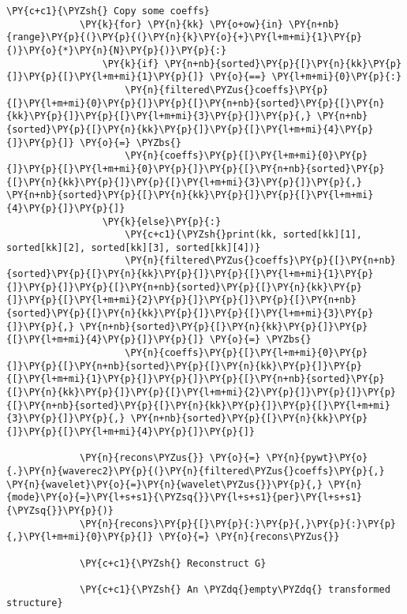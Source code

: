 \begin{Verbatim}[commandchars=\\\{\}]
             \PY{c+c1}{\PYZsh{} Copy some coeffs}
             \PY{k}{for} \PY{n}{kk} \PY{o+ow}{in} \PY{n+nb}{range}\PY{p}{(}\PY{p}{(}\PY{n}{k}\PY{o}{+}\PY{l+m+mi}{1}\PY{p}{)}\PY{o}{*}\PY{n}{N}\PY{p}{)}\PY{p}{:}
                 \PY{k}{if} \PY{n+nb}{sorted}\PY{p}{[}\PY{n}{kk}\PY{p}{]}\PY{p}{[}\PY{l+m+mi}{1}\PY{p}{]} \PY{o}{==} \PY{l+m+mi}{0}\PY{p}{:}
                     \PY{n}{filtered\PYZus{}coeffs}\PY{p}{[}\PY{l+m+mi}{0}\PY{p}{]}\PY{p}{[}\PY{n+nb}{sorted}\PY{p}{[}\PY{n}{kk}\PY{p}{]}\PY{p}{[}\PY{l+m+mi}{3}\PY{p}{]}\PY{p}{,} \PY{n+nb}{sorted}\PY{p}{[}\PY{n}{kk}\PY{p}{]}\PY{p}{[}\PY{l+m+mi}{4}\PY{p}{]}\PY{p}{]} \PY{o}{=} \PYZbs{}
                     \PY{n}{coeffs}\PY{p}{[}\PY{l+m+mi}{0}\PY{p}{]}\PY{p}{[}\PY{l+m+mi}{0}\PY{p}{]}\PY{p}{[}\PY{n+nb}{sorted}\PY{p}{[}\PY{n}{kk}\PY{p}{]}\PY{p}{[}\PY{l+m+mi}{3}\PY{p}{]}\PY{p}{,} \PY{n+nb}{sorted}\PY{p}{[}\PY{n}{kk}\PY{p}{]}\PY{p}{[}\PY{l+m+mi}{4}\PY{p}{]}\PY{p}{]}
                 \PY{k}{else}\PY{p}{:}
                     \PY{c+c1}{\PYZsh{}print(kk, sorted[kk][1], sorted[kk][2], sorted[kk][3], sorted[kk][4])}
                     \PY{n}{filtered\PYZus{}coeffs}\PY{p}{[}\PY{n+nb}{sorted}\PY{p}{[}\PY{n}{kk}\PY{p}{]}\PY{p}{[}\PY{l+m+mi}{1}\PY{p}{]}\PY{p}{]}\PY{p}{[}\PY{n+nb}{sorted}\PY{p}{[}\PY{n}{kk}\PY{p}{]}\PY{p}{[}\PY{l+m+mi}{2}\PY{p}{]}\PY{p}{]}\PY{p}{[}\PY{n+nb}{sorted}\PY{p}{[}\PY{n}{kk}\PY{p}{]}\PY{p}{[}\PY{l+m+mi}{3}\PY{p}{]}\PY{p}{,} \PY{n+nb}{sorted}\PY{p}{[}\PY{n}{kk}\PY{p}{]}\PY{p}{[}\PY{l+m+mi}{4}\PY{p}{]}\PY{p}{]} \PY{o}{=} \PYZbs{}
                     \PY{n}{coeffs}\PY{p}{[}\PY{l+m+mi}{0}\PY{p}{]}\PY{p}{[}\PY{n+nb}{sorted}\PY{p}{[}\PY{n}{kk}\PY{p}{]}\PY{p}{[}\PY{l+m+mi}{1}\PY{p}{]}\PY{p}{]}\PY{p}{[}\PY{n+nb}{sorted}\PY{p}{[}\PY{n}{kk}\PY{p}{]}\PY{p}{[}\PY{l+m+mi}{2}\PY{p}{]}\PY{p}{]}\PY{p}{[}\PY{n+nb}{sorted}\PY{p}{[}\PY{n}{kk}\PY{p}{]}\PY{p}{[}\PY{l+m+mi}{3}\PY{p}{]}\PY{p}{,} \PY{n+nb}{sorted}\PY{p}{[}\PY{n}{kk}\PY{p}{]}\PY{p}{[}\PY{l+m+mi}{4}\PY{p}{]}\PY{p}{]}
                 
             \PY{n}{recons\PYZus{}} \PY{o}{=} \PY{n}{pywt}\PY{o}{.}\PY{n}{waverec2}\PY{p}{(}\PY{n}{filtered\PYZus{}coeffs}\PY{p}{,} \PY{n}{wavelet}\PY{o}{=}\PY{n}{wavelet\PYZus{}}\PY{p}{,} \PY{n}{mode}\PY{o}{=}\PY{l+s+s1}{\PYZsq{}}\PY{l+s+s1}{per}\PY{l+s+s1}{\PYZsq{}}\PY{p}{)}
             \PY{n}{recons}\PY{p}{[}\PY{p}{:}\PY{p}{,}\PY{p}{:}\PY{p}{,}\PY{l+m+mi}{0}\PY{p}{]} \PY{o}{=} \PY{n}{recons\PYZus{}}
         
             \PY{c+c1}{\PYZsh{} Reconstruct G}
         
             \PY{c+c1}{\PYZsh{} An \PYZdq{}empty\PYZdq{} transformed structure}
         

\end{Verbatim}
